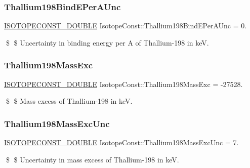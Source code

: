 \subsubsection{\texorpdfstring{Thallium198\+Bind\+E\+Per\+A\+Unc}{Thallium198BindEPerAUnc}}
{\footnotesize\ttfamily \mbox{\hyperlink{group___isotope_const-_macros_ga8f45a7272ce02c0b4c65c44636ed719a}{I\+S\+O\+T\+O\+P\+E\+C\+O\+N\+S\+T\+\_\+\+D\+O\+U\+B\+LE}} Isotope\+Const\+::\+Thallium198\+Bind\+E\+Per\+A\+Unc = 0.}

\$ \$ Uncertainty in binding energy per A of Thallium-\/198 in keV. \mbox{\label{group___isotope_const-_thallium-_tl198_ga43eb1c57cb4f748b30a67e7d787cc1bd}} 
\subsubsection{\texorpdfstring{Thallium198\+Mass\+Exc}{Thallium198MassExc}}
{\footnotesize\ttfamily \mbox{\hyperlink{group___isotope_const-_macros_ga8f45a7272ce02c0b4c65c44636ed719a}{I\+S\+O\+T\+O\+P\+E\+C\+O\+N\+S\+T\+\_\+\+D\+O\+U\+B\+LE}} Isotope\+Const\+::\+Thallium198\+Mass\+Exc = -\/27528.}

\$ \$ Mass excess of Thallium-\/198 in keV. \mbox{\label{group___isotope_const-_thallium-_tl198_ga566fc9d7e4c13642af1c76a1a555ae47}} 
\subsubsection{\texorpdfstring{Thallium198\+Mass\+Exc\+Unc}{Thallium198MassExcUnc}}
{\footnotesize\ttfamily \mbox{\hyperlink{group___isotope_const-_macros_ga8f45a7272ce02c0b4c65c44636ed719a}{I\+S\+O\+T\+O\+P\+E\+C\+O\+N\+S\+T\+\_\+\+D\+O\+U\+B\+LE}} Isotope\+Const\+::\+Thallium198\+Mass\+Exc\+Unc = 7.}

\$ \$ Uncertainty in mass excess of Thallium-\/198 in keV. \mbox{\label{group___isotope_const-_thallium-_tl198_ga226fd7d63215e966af0527f3e93dc953}} 
